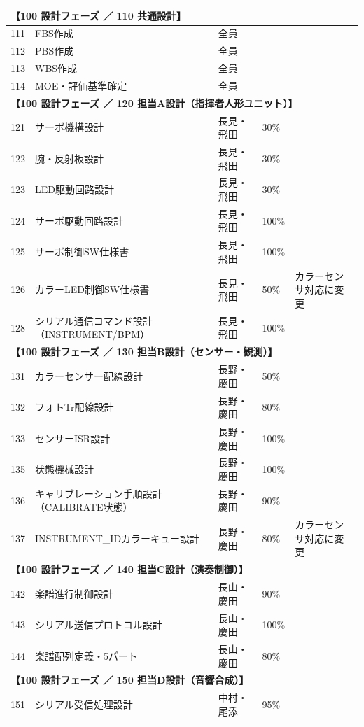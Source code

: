 \begin{longtable}{p{0.9cm}p{7cm}p{2.5cm}p{2cm}p{2cm}}
\multicolumn{5}{l}{\textbf{【100 設計フェーズ ／ 110 共通設計】}} \\
\midrule
111 & FBS作成 & 全員 &  &  \\
112 & PBS作成 & 全員 &  &  \\
113 & WBS作成 & 全員 &  &  \\
114 & MOE・評価基準確定 & 全員 &  &  \\
\midrule
\multicolumn{5}{l}{\textbf{【100 設計フェーズ ／ 120 担当A設計（指揮者人形ユニット）】}} \\
\midrule
121 & サーボ機構設計 & 長見・飛田 & 30\% &  \\
122 & 腕・反射板設計 & 長見・飛田 & 30\% &  \\
123 & LED駆動回路設計 & 長見・飛田 & 30\% &  \\
124 & サーボ駆動回路設計 & 長見・飛田 & 100\% &  \\
125 & サーボ制御SW仕様書 & 長見・飛田 & 100\% &  \\
126 & カラーLED制御SW仕様書 & 長見・飛田 & 50\% & カラーセンサ対応に変更 \\
128 & シリアル通信コマンド設計（INSTRUMENT/BPM） & 長見・飛田 & 100\% &  \\
\midrule
\multicolumn{5}{l}{\textbf{【100 設計フェーズ ／ 130 担当B設計（センサー・観測）】}} \\
\midrule
131 & カラーセンサー配線設計 & 長野・慶田 & 50\% &  \\
132 & フォトTr配線設計 & 長野・慶田 & 80\% &  \\
133 & センサーISR設計 & 長野・慶田 & 100\% &  \\
135 & 状態機械設計 & 長野・慶田 & 100\% &  \\
136 & キャリブレーション手順設計（CALIBRATE状態） & 長野・慶田 & 90\% &  \\
137 & INSTRUMENT\_IDカラーキュー設計 & 長野・慶田 & 80\% & カラーセンサ対応に変更 \\
\midrule
\multicolumn{5}{l}{\textbf{【100 設計フェーズ ／ 140 担当C設計（演奏制御）】}} \\
\midrule
142 & 楽譜進行制御設計 & 長山・慶田 & 90\% &  \\
143 & シリアル送信プロトコル設計 & 長山・慶田 & 100\% &  \\
144 & 楽譜配列定義・5パート & 長山・慶田 & 80\% &  \\
\midrule
\multicolumn{5}{l}{\textbf{【100 設計フェーズ ／ 150 担当D設計（音響合成）】}} \\
\midrule
151 & シリアル受信処理設計 & 中村・尾添 & 95\% &  \\

\end{longtable}
